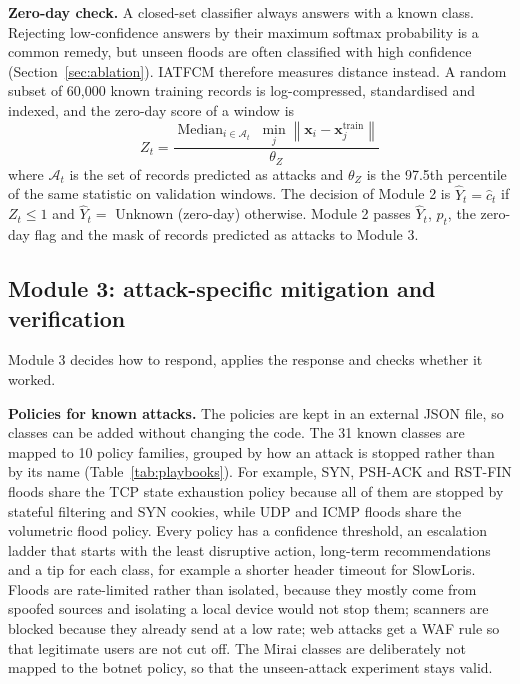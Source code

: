 \documentclass[]{interact}
\theoremstyle{plain}
\theoremstyle{definition}
\begin{document}
\textbf{Zero-day check.} A closed-set classifier always answers with a known class. Rejecting low-confidence answers by their maximum softmax probability\cite{hendrycks2017baseline} is a common remedy, but unseen floods are often classified with high confidence (Section~\ref{sec:ablation}). IATFCM therefore measures distance instead. A random subset of 60,000 known training records is log-compressed, standardised and indexed, and the zero-day score of a window is
\begin{equation}
  Z_t = \frac{\operatorname{Median}_{i \in \mathcal{A}_t}\; \min_{j} \left\lVert \mathbf{x}_i - \mathbf{x}_j^{\text{train}} \right\rVert}{\theta_Z}
\end{equation}
where $\mathcal{A}_t$ is the set of records predicted as attacks and $\theta_Z$ is the 97.5th percentile of the same statistic on validation windows. The decision of Module 2 is $\hat{Y}_t = \hat{c}_t$ if $Z_t \le 1$ and $\hat{Y}_t = $ Unknown (zero-day) otherwise. Module 2 passes $\hat{Y}_t$, $p_t$, the zero-day flag and the mask of records predicted as attacks to Module 3.


\subsection{Module 3: attack-specific mitigation and verification}\label{sec:m3}
Module 3 decides how to respond, applies the response and checks whether it worked.

\textbf{Policies for known attacks.} The policies are kept in an external JSON file, so classes can be added without changing the code. The 31 known classes are mapped to 10 policy families, grouped by how an attack is stopped rather than by its name (Table~\ref{tab:playbooks}). For example, SYN, PSH-ACK and RST-FIN floods share the TCP state exhaustion policy because all of them are stopped by stateful filtering and SYN cookies, while UDP and ICMP floods share the volumetric flood policy. Every policy has a confidence threshold, an escalation ladder that starts with the least disruptive action, long-term recommendations and a tip for each class, for example a shorter header timeout for SlowLoris. Floods are rate-limited rather than isolated, because they mostly come from spoofed sources and isolating a local device would not stop them; scanners are blocked because they already send at a low rate; web attacks get a WAF rule so that legitimate users are not cut off. The Mirai classes are deliberately not mapped to the botnet policy, so that the unseen-attack experiment stays valid.
\end{document}
